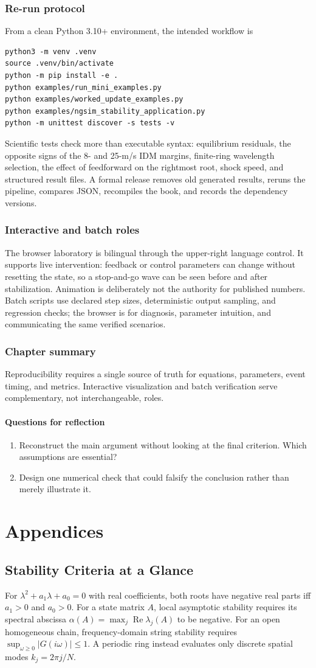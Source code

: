 \documentclass[11pt,a4paper,openany]{book}
\numberwithin{equation}{chapter}
\numberwithin{figure}{chapter}
\numberwithin{table}{chapter}
\newcommand{\chapterend}[1]{\section*{Chapter summary}\addcontentsline{toc}{section}{Chapter summary}\begin{tcolorbox}[resultbox]#1\end{tcolorbox}\subsection*{Questions for reflection}\begin{enumerate}[leftmargin=1.7em]\item Reconstruct the main argument without looking at the final criterion. Which assumptions are essential?\item Design one numerical check that could falsify the conclusion rather than merely illustrate it.\end{enumerate}\clearpage}
\newcommand{\Rea}{\operatorname{Re}}
\begin{document}
\section{Re-run protocol}
From a clean Python 3.10+ environment, the intended workflow is
\begin{verbatim}
python3 -m venv .venv
source .venv/bin/activate
python -m pip install -e .
python examples/run_mini_examples.py
python examples/worked_update_examples.py
python examples/ngsim_stability_application.py
python -m unittest discover -s tests -v
\end{verbatim}
Scientific tests check more than executable syntax: equilibrium residuals, the opposite signs of the 8- and 25-m/s IDM margins, finite-ring wavelength selection, the effect of feedforward on the rightmost root, shock speed, and structured result files. A formal release removes old generated results, reruns the pipeline, compares JSON, recompiles the book, and records the dependency versions.

\section{Interactive and batch roles}
The browser laboratory is bilingual through the upper-right language control. It supports live intervention: feedback or control parameters can change without resetting the state, so a stop-and-go wave can be seen before and after stabilization. Animation is deliberately not the authority for published numbers. Batch scripts use declared step sizes, deterministic output sampling, and regression checks; the browser is for diagnosis, parameter intuition, and communicating the same verified scenarios.

\chapterend{Reproducibility requires a single source of truth for equations, parameters, event timing, and metrics. Interactive visualization and batch verification serve complementary, not interchangeable, roles.}

\appendix
\part{Appendices}

\chapter{Stability Criteria at a Glance}
For $\lambda^2+a_1\lambda+a_0=0$ with real coefficients, both roots have negative real parts iff $a_1>0$ and $a_0>0$. For a state matrix $A$, local asymptotic stability requires its spectral abscissa $\alpha(A)=\max_j\Rea\lambda_j(A)$ to be negative. For an open homogeneous chain, frequency-domain string stability requires $\sup_{\omega\ge0}|G(i\omega)|\le1$. A periodic ring instead evaluates only discrete spatial modes $k_j=2\pi j/N$.
\end{document}
